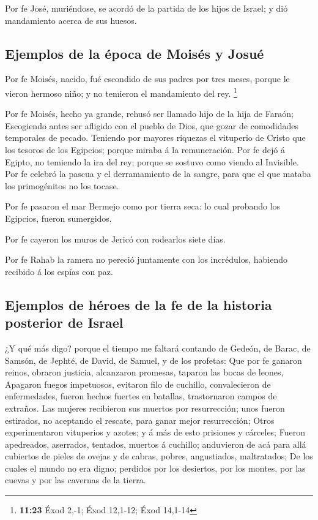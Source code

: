  Por fe José, muriéndose, se acordó de la partida de los
hijos de Israel; y dió mandamiento acerca de sus huesos.

\hypertarget{ejemplos-de-la-uxe9poca-de-moisuxe9s-y-josuuxe9}{%
\subsection{Ejemplos de la época de Moisés y
Josué}\label{ejemplos-de-la-uxe9poca-de-moisuxe9s-y-josuuxe9}}

 Por fe Moisés, nacido, fué escondido de sus padres por
tres meses, porque le vieron hermoso niño; y no temieron el mandamiento
del rey. \footnote{\textbf{11:23} Éxod 2,-1; Éxod 12,1-12; Éxod 14,1-14}

 Por fe Moisés, hecho ya grande, rehusó ser llamado hijo de
la hija de Faraón;  Escogiendo antes ser afligido con el
pueblo de Dios, que gozar de comodidades temporales de pecado.
 Teniendo por mayores riquezas el vituperio de Cristo que
los tesoros de los Egipcios; porque miraba á la remuneración.
 Por fe dejó á Egipto, no temiendo la ira del rey; porque
se sostuvo como viendo al Invisible.  Por fe celebró la
pascua y el derramamiento de la sangre, para que el que mataba los
primogénitos no los tocase.

 Por fe pasaron el mar Bermejo como por tierra seca: lo
cual probando los Egipcios, fueron sumergidos.

 Por fe cayeron los muros de Jericó con rodearlos siete
días.

 Por fe Rahab la ramera no pereció juntamente con los
incrédulos, habiendo recibido á los espías con paz.

\hypertarget{ejemplos-de-huxe9roes-de-la-fe-de-la-historia-posterior-de-israel}{%
\subsection{Ejemplos de héroes de la fe de la historia posterior de
Israel}\label{ejemplos-de-huxe9roes-de-la-fe-de-la-historia-posterior-de-israel}}

 ¿Y qué más digo? porque el tiempo me faltará contando de
Gedeón, de Barac, de Samsón, de Jephté, de David, de Samuel, y de los
profetas:  Que por fe ganaron reinos, obraron justicia,
alcanzaron promesas, taparon las bocas de leones,  Apagaron
fuegos impetuosos, evitaron filo de cuchillo, convalecieron de
enfermedades, fueron hechos fuertes en batallas, trastornaron campos de
extraños.  Las mujeres recibieron sus muertos por
resurrección; unos fueron estirados, no aceptando el rescate, para ganar
mejor resurrección;  Otros experimentaron vituperios y
azotes; y á más de esto prisiones y cárceles;  Fueron
apedreados, aserrados, tentados, muertos á cuchillo; anduvieron de acá
para allá cubiertos de pieles de ovejas y de cabras, pobres,
angustiados, maltratados;  De los cuales el mundo no era
digno; perdidos por los desiertos, por los montes, por las cuevas y por
las cavernas de la tierra.

